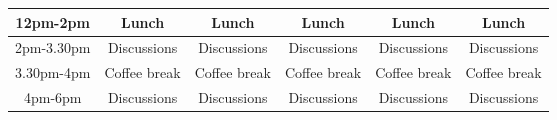 \documentclass{beamer}
\begin{document}
\begin{frame}
\begin{block}{}
{\begin{tabular}{cccccc}
\hline
12pm-2pm       & Lunch                                                                                & Lunch                                                                       & Lunch                                                      & Lunch                                                                            & Lunch                                      \\
\hline
2pm-3.30pm     & Discussions                                                                          & Discussions                                                                 & Discussions                                                & Discussions                                                                      & Discussions                                \\
\hline
3.30pm-4pm     & Coffee break                                                                         & Coffee break                                                                & Coffee break                                               & Coffee break                                                                     & Coffee break                               \\
4pm-6pm        & Discussions                                                                          & Discussions                                                                 & Discussions                                                & Discussions                                                                      & Discussions                                \\
\hline
\end{tabular}
}

\noindent

\end{block}
\end{frame}
\end{document}
